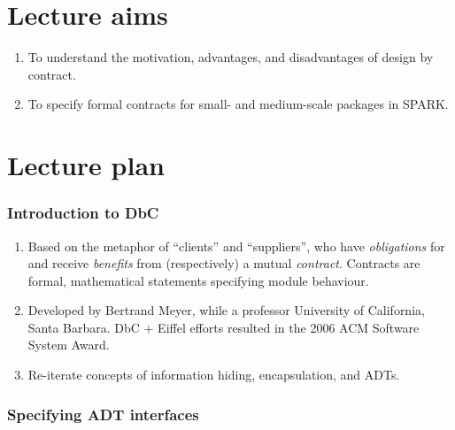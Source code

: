 \documentclass[11pt]{article}
\begin{document}
\section*{Lecture aims}

 \begin{enumerate}

 \item To understand the motivation, advantages, and disadvantages of design by contract.

 \item To specify formal contracts for small- and medium-scale packages in SPARK.


 \end{enumerate}

\section*{Lecture plan}
  
\subsubsection*{Introduction to DbC}

\begin{enumerate}

  \item Based on the metaphor of ``clients'' and ``suppliers'', who have \emph{obligations} for and receive  \emph{benefits} from (respectively) a mutual \emph{contract}. Contracts are formal, mathematical statements specifying module behaviour.

  \item Developed by Bertrand Meyer, while a professor University of California, Santa Barbara. DbC + Eiffel efforts resulted in the 2006 ACM Software System Award.

  \item Re-iterate concepts of information hiding, encapsulation, and ADTs.

\end{enumerate}

\subsubsection*{Specifying ADT interfaces}
\end{document}
